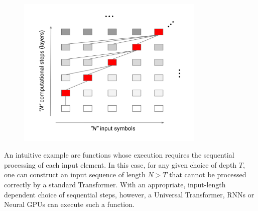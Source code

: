 \begin{figure}[t]
\centering
\includegraphics[width=0.8\textwidth, trim={0.1cm 0.5cm 0.1cm 1.2cm}, clip]{04-part-03/chapter-06/figs_and_tables/fig_universality_example.png}
\end{figure}

An intuitive example are functions whose execution requires the sequential processing of each input element. In this case, for any given choice of depth $T$, one can construct an input sequence of length $N>T$ that cannot be processed correctly by a standard Transformer. With an appropriate, input-length dependent choice of sequential steps, however, a Universal Transformer, RNNs or Neural GPUs can execute such a function.